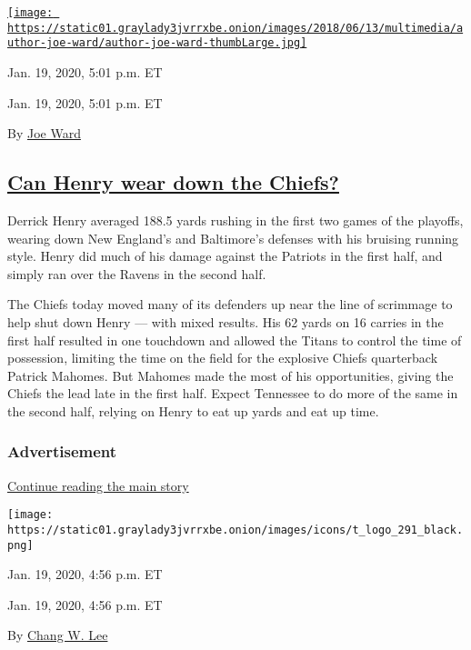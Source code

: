 \href{https://www.nytimes3xbfgragh.onion/by/joe-ward}{\texttt{[image: https://static01.graylady3jvrrxbe.onion/images/2018/06/13/multimedia/author-joe-ward/author-joe-ward-thumbLarge.jpg]}}

Jan. 19, 2020, 5:01 p.m. ET

Jan. 19, 2020, 5:01 p.m. ET

By \href{https://www.nytimes3xbfgragh.onion/by/joe-ward}{Joe Ward}

\hypertarget{can-henry-wear-down-the-chiefs}{%
\subsection{\texorpdfstring{\protect\hyperlink{can-henry-wear-down-the-chiefs}{Can
Henry wear down the
Chiefs?}}{Can Henry wear down the Chiefs?}}\label{can-henry-wear-down-the-chiefs}}

Derrick Henry averaged 188.5 yards rushing in the first two games of the
playoffs, wearing down New England's and Baltimore's defenses with his
bruising running style. Henry did much of his damage against the
Patriots in the first half, and simply ran over the Ravens in the second
half.

The Chiefs today moved many of its defenders up near the line of
scrimmage to help shut down Henry --- with mixed results. His 62 yards
on 16 carries in the first half resulted in one touchdown and allowed
the Titans to control the time of possession, limiting the time on the
field for the explosive Chiefs quarterback Patrick Mahomes. But Mahomes
made the most of his opportunities, giving the Chiefs the lead late in
the first half. Expect Tennessee to do more of the same in the second
half, relying on Henry to eat up yards and eat up time.

\hypertarget{advertisement-2}{%
\subsubsection{Advertisement}\label{advertisement-2}}

\protect\hyperlink{after-dfp-ad-mid3}{Continue reading the main story}

\texttt{[image: https://static01.graylady3jvrrxbe.onion/images/icons/t\_logo\_291\_black.png]}

Jan. 19, 2020, 4:56 p.m. ET

Jan. 19, 2020, 4:56 p.m. ET

By \href{https://www.nytimes3xbfgragh.onion/by/chang-w-lee}{Chang W.
Lee}

